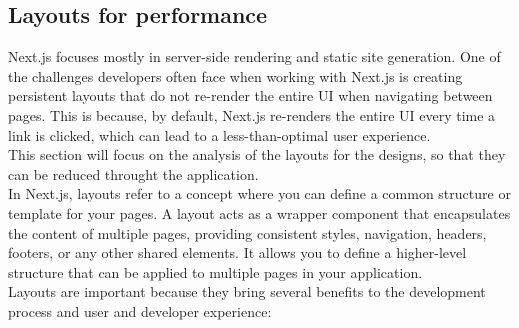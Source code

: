 \documentclass[./memory.tex]{subfiles}
\begin{document}
\subsection{Layouts for performance}
Next.js focuses mostly in server-side rendering and static site generation. One
of the challenges developers often face when working with Next.js is creating
persistent layouts that do not re-render the entire UI when navigating between
pages. This is because, by default, Next.js re-renders the entire UI every time
a link is clicked, which can lead to a less-than-optimal user experience.
\\
This section will focus on the analysis of the layouts for the designs, so that
they can be reduced throught the application.
\\[8pt]
In Next.js, layouts \cite{nextjs-layouts} refer to a concept where you can define
a common structure or template for your pages. A layout acts as a wrapper
component that encapsulates the content of multiple pages, providing consistent
styles, navigation, headers, footers, or any other shared elements. It allows
you to define a higher-level structure that can be applied to multiple pages in
your application.
\\
Layouts are important because they bring several benefits to the development
process and user and developer experience:
\end{document}
